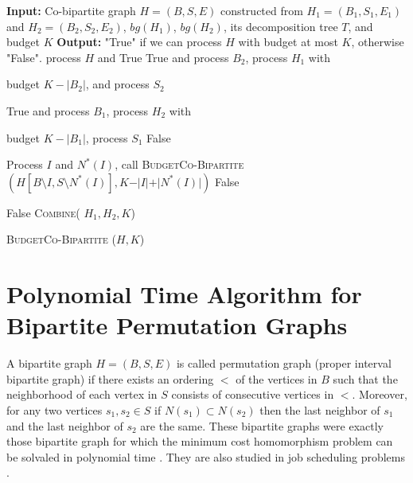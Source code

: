 \documentclass[letterpaper,11pt,abstracton]{scrartcl}
\begin{document}
\begin{algorithm}[H]
\begin{algorithmic}[1]
\State \textbf{Input:}  Co-bipartite graph $H=(B,S,E)$ constructed from
$H_1=(B_1,S_1,E_1)$ and $H_2=(B_2,S_2,E_2)$, $bg(H_1)$, $bg(H_2)$, its decomposition tree $T$, and budget $K$\;
\State \textbf{Output:} "True" if we can process $H$ with budget at most $K$, otherwise "False".\;
 \label{firstIF-co}
 process $H$ and \Return True\;
\EndIf
{}
    	\Return True and process $B_2$, process $H_1$ with
    	
    	\hspace{3mm}  budget $K-|B_2|$, and process $S_2$\;
    	
    	\Return True and process $B_1$, process $H_2$ with
    	
    	\hspace{3mm} budget $K-|B_1|$, process $S_1$\;
    \Else {} \Return False\;
    \EndIf
\EndIf 


  \State Process $I$ and $N^*(I)$,
     \State \Return call \textsc{BudgetCo-Bipartite}
     $(H[B \setminus I,S \setminus N^{*}(I)],K-\vert I\vert +\vert N^{*}(I)\vert)$\;
\EndIf {}
\Return False\;
\EndIf


\Return False\;
\Else {} \Return \textsc{Combine}( $H_1,H_2, K$)
\EndIf
\EndIf
\end{algorithmic}
\caption{{\textsc{BudgetCo-Bipartite}} ($H, K$)}
\label{alg:co-bipartite}
\end{algorithm}



\section{Polynomial Time Algorithm for Bipartite Permutation Graphs}\label{sec:poly-permutation}
A bipartite graph $H=(B,S,E)$ is called permutation graph (proper interval bipartite graph) if there exists an ordering $<$
of the vertices in $B$ such that the neighborhood of each vertex in $S$ consists of consecutive vertices in $<$. Moreover, for any two
vertices $s_1,s_2 \in S$ if $N(s_1) \subset N(s_2)$ then the last neighbor of $s_1$ and the last neighbor of $s_2$ are the same.
These bipartite graphs were exactly those bipartite graph for which  the  minimum cost homomorphism problem can be solvaled in polynomial time \cite{GHRY08}. 
They are also studied  in job scheduling problems \cite{KKRS13,MS12}. 
\end{document}
